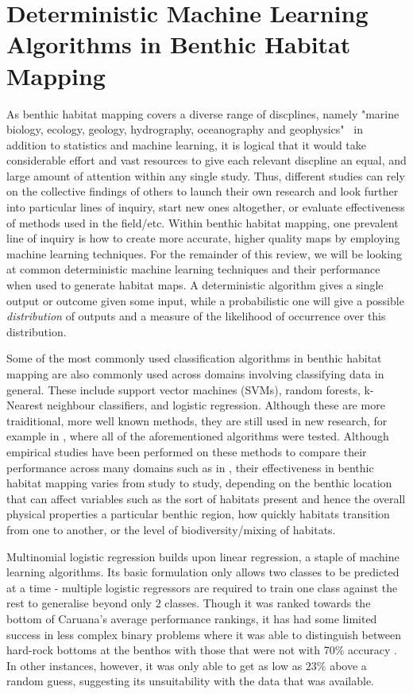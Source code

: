 \section{Deterministic Machine Learning Algorithms in Benthic Habitat Mapping}
As benthic habitat mapping covers a diverse range of discplines, namely "marine biology, ecology, geology, hydrography, oceanography and geophysics"~\citep{cjbrown11} in addition to statistics and machine learning, it is logical that it would take considerable effort and vast resources to give each relevant discpline an equal, and large amount of attention within any single study. Thus, different studies can rely on the collective findings of others to launch their own research and look further into particular lines of inquiry, start new ones altogether, or evaluate effectiveness of methods used in the field/etc. Within benthic habitat mapping, one prevalent line of inquiry is how to create more accurate, higher quality maps by employing machine learning techniques. For the remainder of this review, we will be looking at common deterministic machine learning techniques and their performance when used to generate habitat maps. A deterministic algorithm gives a single output or outcome given some input, while a probabilistic one will give a possible \textit{distribution} of outputs and a measure of the likelihood of occurrence over this distribution. 

Some of the most commonly used classification algorithms in benthic habitat mapping are also commonly used across domains involving classifying data in general. These include support vector machines (SVMs), random forests, k-Nearest neighbour classifiers, and logistic regression. Although these are more traiditional, more well known methods, they are still used in new research, for example in \citet{wahidin15}, where all of the aforementioned algorithms were tested. Although empirical studies have been performed on these methods to compare their performance across many domains such as in \citet{caruana06}, their effectiveness in benthic habitat mapping varies from study to study, depending on the benthic location that can affect variables such as the sort of habitats present and hence the overall physical properties a particular benthic region, how quickly habitats transition from one to another, or the level of biodiversity/mixing of habitats.

Multinomial logistic regression builds upon linear regression, a staple of machine learning algorithms. Its basic formulation only allows two classes to be predicted at a time - multiple logistic regressors are required to train one class against the rest to generalise beyond only $2$ classes. Though it was ranked towards the bottom of Caruana's average performance rankings, it has had some limited success in less complex binary problems where it was able to distinguish between hard-rock bottoms at the benthos with those that were not with 70\% accuracy \citep{dunn09}. In other instances, however, it was only able to get as low as $23\%$ above a random guess\citep{belander}, suggesting its unsuitability with the data that was available.


